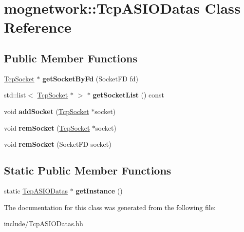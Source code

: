 \hypertarget{classmognetwork_1_1_tcp_a_s_i_o_datas}{\section{mognetwork\-:\-:Tcp\-A\-S\-I\-O\-Datas Class Reference}
\label{classmognetwork_1_1_tcp_a_s_i_o_datas}
}
\subsection*{Public Member Functions}
\begin{DoxyCompactItemize}
\item 
\hypertarget{classmognetwork_1_1_tcp_a_s_i_o_datas_a97b9895517d49687c35663ec4de5453e}{\hyperlink{classmognetwork_1_1_tcp_socket}{Tcp\-Socket} $\ast$ {\bfseries get\-Socket\-By\-Fd} (Socket\-F\-D fd)}\label{classmognetwork_1_1_tcp_a_s_i_o_datas_a97b9895517d49687c35663ec4de5453e}

\item 
\hypertarget{classmognetwork_1_1_tcp_a_s_i_o_datas_a7c5c65122f57d2186fb735416a790763}{std\-::list$<$ \hyperlink{classmognetwork_1_1_tcp_socket}{Tcp\-Socket} $\ast$ $>$ $\ast$ {\bfseries get\-Socket\-List} () const }\label{classmognetwork_1_1_tcp_a_s_i_o_datas_a7c5c65122f57d2186fb735416a790763}

\item 
\hypertarget{classmognetwork_1_1_tcp_a_s_i_o_datas_aa52b9fb9195d372f5b647d7631cf5b72}{void {\bfseries add\-Socket} (\hyperlink{classmognetwork_1_1_tcp_socket}{Tcp\-Socket} $\ast$socket)}\label{classmognetwork_1_1_tcp_a_s_i_o_datas_aa52b9fb9195d372f5b647d7631cf5b72}

\item 
\hypertarget{classmognetwork_1_1_tcp_a_s_i_o_datas_a49a15b15392fadb168ae376c72b7f9e0}{void {\bfseries rem\-Socket} (\hyperlink{classmognetwork_1_1_tcp_socket}{Tcp\-Socket} $\ast$socket)}\label{classmognetwork_1_1_tcp_a_s_i_o_datas_a49a15b15392fadb168ae376c72b7f9e0}

\item 
\hypertarget{classmognetwork_1_1_tcp_a_s_i_o_datas_a4699eb56dd2868e62babcea3d2b6da00}{void {\bfseries rem\-Socket} (Socket\-F\-D socket)}\label{classmognetwork_1_1_tcp_a_s_i_o_datas_a4699eb56dd2868e62babcea3d2b6da00}

\end{DoxyCompactItemize}
\subsection*{Static Public Member Functions}
\begin{DoxyCompactItemize}
\item 
\hypertarget{classmognetwork_1_1_tcp_a_s_i_o_datas_af07cf0c2b0e71e370d7975a97ba7cc83}{static \hyperlink{classmognetwork_1_1_tcp_a_s_i_o_datas}{Tcp\-A\-S\-I\-O\-Datas} $\ast$ {\bfseries get\-Instance} ()}\label{classmognetwork_1_1_tcp_a_s_i_o_datas_af07cf0c2b0e71e370d7975a97ba7cc83}

\end{DoxyCompactItemize}


The documentation for this class was generated from the following file\-:\begin{DoxyCompactItemize}
\item 
include/Tcp\-A\-S\-I\-O\-Datas.\-hh\end{DoxyCompactItemize}
